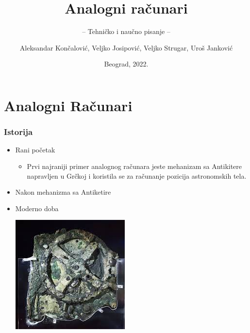 \documentclass[14pt]{beamer}
\title{Analogni računari}
\subtitle{-- Tehničko i naučno pisanje --}
\author{Aleksandar Končalović, Veljko Josipović, Veljko Strugar, Uroš Janković}
\institute{Matematički fakultet\\Univerzitet u Beogradu}
\date{
	\footnotesize{Beograd, 2022.}	
}
\begin{document}
\begin{frame}
	\thispagestyle{empty}
	\titlepage
\end{frame}

\addtocounter{framenumber}{-1}

\section{Analogni Računari}
\begin{frame}[fragile]\frametitle{Istorija}
	\begin{itemize}
		\item Rani početak
		\begin{itemize}
			\item Prvi najraniji primer analognog računara jeste mehanizam sa Antikitere napravljen u Grčkoj i koristila se za računanje pozicija astronomskih tela.
		\end{itemize}
	\end{itemize}
\begin{itemize}
	\item Nakon mehanizma sa Antiketire
    \item Moderno doba
	\begin{itemize}
	\end{itemize}
 \begin{center}
\includegraphics[scale=0.6]{MehanizamSaAntiketere.jpg}
\end{center}
\end{itemize}
\end{frame}
\end{document}

